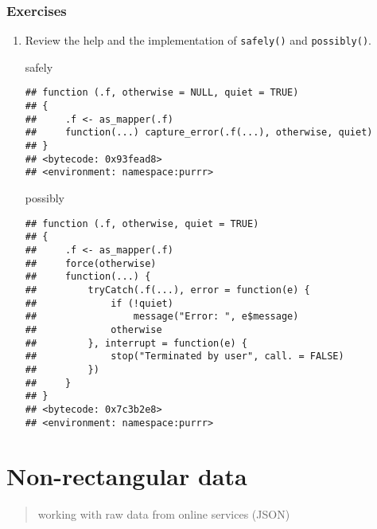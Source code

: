 \documentclass[]{book}
\newenvironment{Shaded}{\begin{snugshade}}{\end{snugshade}}
\newcommand{\NormalTok}[1]{#1}
\begin{document}
\hypertarget{exercises-19}{%
\subsection{Exercises}\label{exercises-19}}

\begin{enumerate}
\def\labelenumi{\arabic{enumi}.}
\item
  Review the help and the implementation of \texttt{safely()} and \texttt{possibly()}.

\begin{Shaded}
\begin{Highlighting}[]
\NormalTok{safely}
\end{Highlighting}
\end{Shaded}

\begin{verbatim}
## function (.f, otherwise = NULL, quiet = TRUE) 
## {
##     .f <- as_mapper(.f)
##     function(...) capture_error(.f(...), otherwise, quiet)
## }
## <bytecode: 0x93fead8>
## <environment: namespace:purrr>
\end{verbatim}

\begin{Shaded}
\begin{Highlighting}[]
\NormalTok{possibly}
\end{Highlighting}
\end{Shaded}

\begin{verbatim}
## function (.f, otherwise, quiet = TRUE) 
## {
##     .f <- as_mapper(.f)
##     force(otherwise)
##     function(...) {
##         tryCatch(.f(...), error = function(e) {
##             if (!quiet) 
##                 message("Error: ", e$message)
##             otherwise
##         }, interrupt = function(e) {
##             stop("Terminated by user", call. = FALSE)
##         })
##     }
## }
## <bytecode: 0x7c3b2e8>
## <environment: namespace:purrr>
\end{verbatim}
\end{enumerate}

\hypertarget{non-rectangular-data}{%
\chapter{Non-rectangular data}\label{non-rectangular-data}}

\begin{quote}
working with raw data from online services (JSON)
\end{quote}
\end{document}
